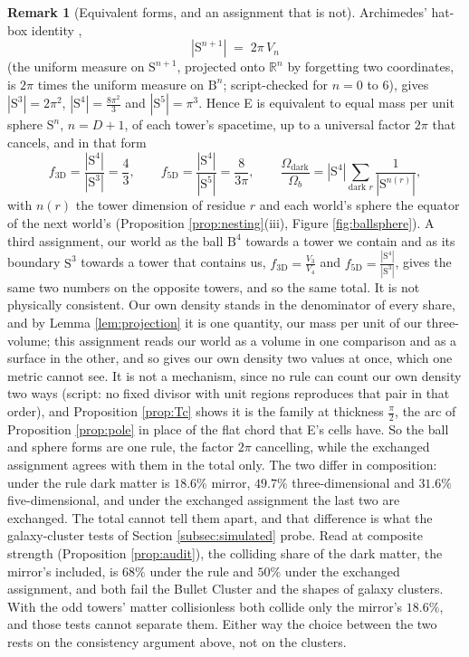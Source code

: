 \documentclass[11pt]{article}
\theoremstyle{definition}
\newtheorem{remark}[theorem]{Remark}
\newcommand{\R}{\mathbb{R}}
\newcommand{\B}{\mathrm{B}}
\newcommand{\Sph}{\mathrm{S}}
\begin{document}
\begin{remark}[Equivalent forms, and an assignment that is not]\label{rem:forms}
Archimedes' hat-box identity \cite{Archimedes},
\[
|\Sph^{n+1}| \;=\; 2\pi\,V_{n}
\]
(the uniform measure on $\Sph^{n+1}$, projected onto $\R^{n}$ by forgetting two coordinates, is $2\pi$ times the uniform measure on $\B^{n}$; script-checked for $n = 0$ to $6$), gives $|\Sph^{3}| = 2\pi^{2}$, $|\Sph^{4}| = \tfrac{8\pi^{2}}{3}$ and $|\Sph^{5}| = \pi^{3}$. Hence E is equivalent to equal mass per unit sphere $\Sph^{n}$, $n = D + 1$, of each tower's spacetime, up to a universal factor $2\pi$ that cancels, and in that form
\[
f_{3\mathrm{D}} = \frac{|\Sph^{4}|}{|\Sph^{3}|} = \frac{4}{3}, \qquad f_{5\mathrm{D}} = \frac{|\Sph^{4}|}{|\Sph^{5}|} = \frac{8}{3\pi}, \qquad
\frac{\Omega_{\mathrm{dark}}}{\Omega_{b}} = |\Sph^{4}|\sum_{\text{dark }r}\frac{1}{|\Sph^{n(r)}|},
\]
with $n(r)$ the tower dimension of residue $r$ and each world's sphere the equator of the next world's (Proposition \ref{prop:nesting}(iii), Figure \ref{fig:ballsphere}). A third assignment, our world as the ball $\B^{4}$ towards a tower we contain and as its boundary $\Sph^{3}$ towards a tower that contains us, $f_{3\mathrm{D}} = \tfrac{V_{3}}{V_{4}}$ and $f_{5\mathrm{D}} = \tfrac{|\Sph^{4}|}{|\Sph^{3}|}$, gives the same two numbers on the opposite towers, and so the same total. It is not physically consistent. Our own density stands in the denominator of every share, and by Lemma \ref{lem:projection} it is one quantity, our mass per unit of our three-volume; this assignment reads our world as a volume in one comparison and as a surface in the other, and so gives our own density two values at once, which one metric cannot see. It is not a mechanism, since no rule can count our own density two ways (script: no fixed divisor with unit regions reproduces that pair in that order), and Proposition \ref{prop:Tc} shows it is the family at thickness $\tfrac{\pi}{2}$, the arc of Proposition \ref{prop:pole} in place of the flat chord that E's cells have. So the ball and sphere forms are one rule, the factor $2\pi$ cancelling, while the exchanged assignment agrees with them in the total only. The two differ in composition: under the rule dark matter is $18.6\%$ mirror, $49.7\%$ three-dimensional and $31.6\%$ five-dimensional, and under the exchanged assignment the last two are exchanged. The total cannot tell them apart, and that difference is what the galaxy-cluster tests of Section \ref{subsec:simulated} probe. Read at composite strength (Proposition \ref{prop:audit}), the colliding share of the dark matter, the mirror's included, is $68\%$ under the rule and $50\%$ under the exchanged assignment, and both fail the Bullet Cluster and the shapes of galaxy clusters. With the odd towers' matter collisionless both collide only the mirror's $18.6\%$, and those tests cannot separate them. Either way the choice between the two rests on the consistency argument above, not on the clusters.
\end{remark}
\end{document}
